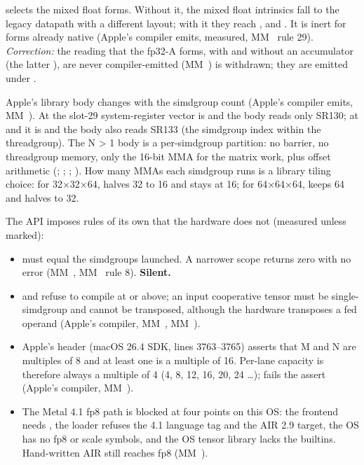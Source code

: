  selects the mixed float forms. Without it, the mixed float intrinsics fall to the legacy
datapath with a different layout; with it they reach ,  and . It is inert for forms already
native (Apple's compiler emits, measured, MM~ rule 29). \emph{Correction:} the reading that the fp32-A forms, with and
without an accumulator (the latter ), are never compiler-emitted
(MM~) is withdrawn; they are emitted under .

Apple's library body changes with the simdgroup count (Apple's compiler emits, MM~). At  the slot-29
system-register vector is \code{[52]} and the body reads only SR130; at  and  it is \code{[52, 53]} and the body also
reads SR133 (the simdgroup index within the threadgroup). The N > 1 body is a per-simdgroup partition: no barrier, no
threadgroup memory, only the 16-bit MMA for the matrix work, plus offset arithmetic (; ; ; ). How many MMAs each simdgroup runs is a library tiling choice: for 32×32×64,  halves 32 to
16 and  stays at 16; for 64×64×64,  keeps 64 and  halves to 32.

The API imposes rules of its own that the hardware does not (measured unless marked):

\begin{itemize}
\item {} must equal the simdgroups launched. A narrower scope returns zero with no error (MM~,
  MM~ rule 8). \textbf{Silent.}
\item {} and  refuse to compile at  or above; an input cooperative
  tensor must be single-simdgroup and cannot be transposed, although the hardware transposes a fed operand (Apple's
  compiler, MM~, MM~).
\item Apple's header  (macOS 26.4 SDK, lines 3763–3765) asserts that M and N are multiples of
  8 and at least one is a multiple of 16. Per-lane capacity  is therefore always a multiple of 4 (4, 8, 12,
  16, 20, 24 \dots{});  fails the assert (Apple's compiler, MM~).
\item The Metal 4.1 fp8 path is blocked at four points on this OS: the frontend needs , the loader refuses the
  4.1 language tag and the AIR 2.9 target, the OS  has no fp8 or scale symbols, and the OS tensor
  library lacks the builtins. Hand-written AIR still reaches fp8 (MM~).
\end{itemize}

